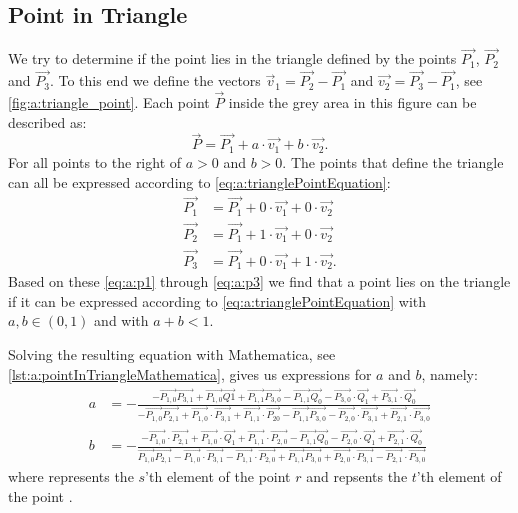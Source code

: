 \subsection*{Point in Triangle}

We try to determine if the point  lies in the triangle defined by the points $\vec{P_1}$, $\vec{P_2}$ and $\vec{P_3}$. To this end we define the vectors $\vec{v}_1 = \vec{P_2} - \vec{P_1}$ and $\vec{v_2} = \vec{P_3} - \vec{P_1}$, see \autoref{fig:a:triangle_point}. Each point $\vec{P}$ inside the grey area in this figure can be described as:
\begin{equation} \label{eq:a:trianglePointEquation}
	\vec{P} = \vec{P_1} + a \cdot \vec{v_1} + b \cdot \vec{v_2}.
\end{equation}
For all points to the right of  $a > 0$ and $b > 0$. The points that define the triangle can all be expressed according to \eqref{eq:a:trianglePointEquation}:
\begin{align}
	\vec{P_1} &= \vec{P_1} + 0 \cdot \vec{v_1} + 0 \cdot \vec{v_2} \label{eq:a:p1}\\ 
	\vec{P_2} &= \vec{P_1} + 1 \cdot \vec{v_1} + 0 \cdot \vec{v_2} \label{eq:a:p2}\\ 
	\vec{P_3} &= \vec{P_1} + 0 \cdot \vec{v_1} + 1 \cdot \vec{v_2} \label{eq:a:p3}.
\end{align}
Based on these \eqref{eq:a:p1} through \eqref{eq:a:p3} we find that a point  lies on the triangle if it can be expressed according to \eqref{eq:a:trianglePointEquation} with $a,b \in (0,1)$ and with $a + b < 1$. 

Solving the resulting equation with Mathematica, see \autoref{lst:a:pointInTriangleMathematica}, gives us expressions for $a$ and $b$, namely:
	\begin{align}
	a &= -\frac{-\vec{P_{1,0}} \vec{P_{3,1}}+\vec{P_{1,0}} \vec{Q1}+\vec{P_{1,1}} \vec{P_{3,0}}-\vec{P_{1,1}}
   \vec{Q_0} - \vec{P_{3,0}} \cdot \vec{Q_1}+\vec{P_{3,1}} \cdot \vec{Q_0}}{ - \vec{P_{1,0}}
   \vec{P_{2,1}}+\vec{P_{1,0}} \cdot \vec{P_{3,1}}+\vec{P_{1,1}} \cdot \vec{P_{20}} - \vec{P_{1,1}}
   \vec{P_{3,0}} - \vec{P_{2,0}} \cdot \vec{P_{3,1}}+\vec{P_{2,1}} \cdot \vec{P_{3,0}}}\label{eq:a:a}\\
	b &=  - \frac{ - \vec{P_{1,0}} \cdot \vec{P_{2,1}}+\vec{P_{1,0}} \cdot \vec{Q_1}+\vec{P_{1,1}} \cdot \vec{P_{2,0}} - \vec{P_{1,1}}
   \vec{Q_0} - \vec{P_{2,0}} \cdot \vec{Q_1}+\vec{P_{2,1}} \cdot \vec{Q_0}}{\vec{P_{1,0}}
   \vec{P_{2,1}} - \vec{P_{1,0}} \cdot \vec{P_{3,1}} - \vec{P_{1,1}} \cdot \vec{P_{2,0}}+\vec{P_{1,1}}
   \vec{P_{3,0}}+\vec{P_{2,0}} \cdot \vec{P_{3,1}} - \vec{P_{2,1}} \cdot \vec{P_{3,0}}}\label{eq:a:b}
	\end{align}
where  represents the $s$'th element of the point $r$ and  repsents the $t$'th element of the point .

